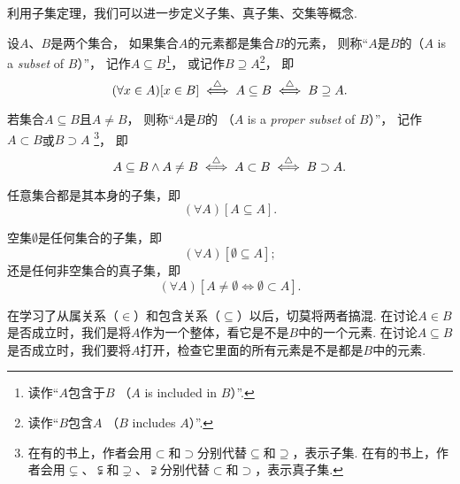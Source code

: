 利用子集定理，我们可以进一步定义子集、真子集、交集等概念.
\begin{definition}\label{definition:集合论.子集的定义}
设\(A\)、\(B\)是两个集合，
如果集合\(A\)的元素都是集合\(B\)的元素，
则称“\(A\)是\(B\)的（\(A\) is a \emph{subset} of \(B\)）”，
记作\(A \subseteq B\)\footnote{读作“\(A\)包含于\(B\)
（\(A\) is included in \(B\)）”.}，
或记作\(B \supseteq A\)\footnote{读作“\(B\)包含\(A\)
（\(B\) includes \(A\)）”.}，
即\begin{equation*}
	(\forall x \in A)[x \in B]
	\overset{\triangle}{\iff}
	A \subseteq B
	\overset{\triangle}{\iff}
	B \supseteq A.
\end{equation*}

若集合\(A \subseteq B\)且\(A \neq B\)，
则称“\(A\)是\(B\)的%
（\(A\) is a \emph{proper subset} of \(B\)）”，
记作\(A \subset B\)或\(B \supset A\)
\footnote{
	在有的书上，作者会用\(\subset\)和\(\supset\)分别代替\(\subseteq\)和\(\supseteq\)，表示子集.
	在有的书上，作者会用\(\subsetneq\)、\(\subsetneqq\)和\(\supsetneq\)、\(\supsetneqq\)分别代替\(\subset\)和\(\supset\)，表示真子集.
}，
即\begin{equation*}
	A \subseteq B
	\land
	A \neq B
	\overset{\triangle}{\iff}
	A \subset B
	\overset{\triangle}{\iff}
	B \supset A.
\end{equation*}
\end{definition}

\begin{theorem}
任意集合都是其本身的子集，即\begin{equation*}
	(\forall A)[A \subseteq A].
\end{equation*}
\end{theorem}

\begin{theorem}\label{theorem:子集公理.空集是任何集合的子集}
空集\(\emptyset\)是任何集合的子集，即\begin{equation*}
	(\forall A)[\emptyset \subseteq A];
\end{equation*}
还是任何非空集合的真子集，即\begin{equation*}
	(\forall A)[A \neq \emptyset \iff \emptyset \subset A].
\end{equation*}
\end{theorem}

在学习了从属关系（\(\in\)）和包含关系（\(\subseteq\)）以后，切莫将两者搞混.
在讨论\(A \in B\)是否成立时，我们是将\(A\)作为一个整体，看它是不是\(B\)中的一个元素.
在讨论\(A \subseteq B\)是否成立时，我们要将\(A\)打开，检查它里面的所有元素是不是都是\(B\)中的元素.

